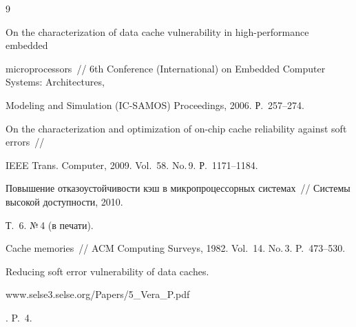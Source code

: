 {\frenchspacing\small




\begin{thebibliography}{9}









On  the characterization of data cache vulnerability in high-performance embedded 


microprocessors~// 6th  Conference (International) on Embedded Computer Systems: Architectures, 


Modeling and Simulation (IC-SAMOS) Proceedings, 2006.  Р.~257--274.









On the characterization and optimization of on-chip cache reliability against soft errors~// 


IEEE Trans. Computer, 2009. Vol.~58. No.\,9. Р.~1171--1184.












Повышение отказоустойчивости кэш в микропроцессорных системах~// Системы высокой доступности,  2010. 


Т.~6. №\,4 (в печати).









Cache memories~// ACM Computing  Surveys, 1982. Vol.~14. No.\,3. P.~473--530.









Reducing soft error vulnerability of data caches. {\sf 


www.selse3.selse.org/Papers/5\_Vera\_P.pdf}. P.~4.








\end{thebibliography}}
